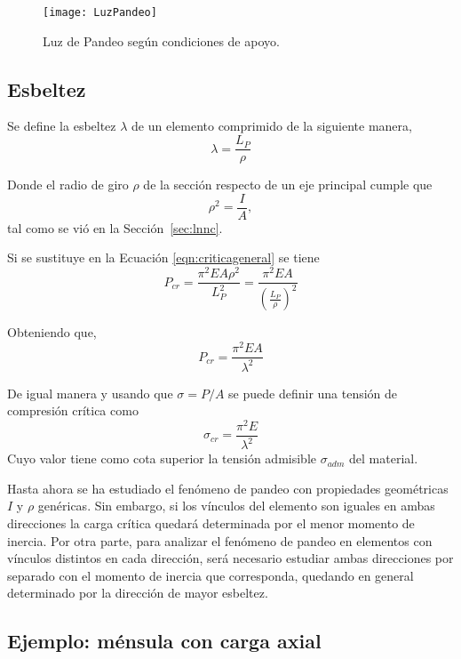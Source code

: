 \begin{figure}[htb]
	\centering
	\texttt{[image: LuzPandeo]}
	\caption{Luz de Pandeo según condiciones de apoyo.}
	\label{fig:luzpandeo}
\end{figure}

\subsection{Esbeltez}

Se define la esbeltez $\lambda$ de un elemento comprimido de la siguiente manera,
\begin{equation}
\lambda = \frac{L_P}{\rho}
\end{equation}

Donde el radio de giro $\rho$ de la sección respecto de un eje principal cumple que
\begin{equation}
\rho^2 = \frac{I}{A},
\end{equation}
tal como se vió en la Sección~\ref{sec:lnnc}.

Si se sustituye en la Ecuación \eqref{eqn:criticageneral} se tiene
$$
P_{cr} = \frac{\pi^2 E A \rho^2}{L_P^2} = \frac{\pi^2 E A}{\left(\frac{L_P}{\rho}\right)^2}
$$

Obteniendo que,
\begin{equation}
\boxed{P_{cr} = \frac{\pi^2 E A}{\lambda^2}}
\end{equation}

De igual manera y usando que $\sigma=P/A$ se puede definir una tensión de compresión crítica como  
\begin{equation}
\boxed{\sigma_{cr} = \frac{\pi^2 E}{\lambda^2}}
\end{equation}
Cuyo valor tiene como cota superior la tensión admisible $\sigma_{adm}$ del material.

Hasta ahora se ha estudiado el fenómeno de pandeo con propiedades geométricas $I$ y $\rho$ genéricas. Sin embargo, si los vínculos del elemento son iguales en ambas direcciones la carga crítica quedará determinada por el menor momento de inercia. Por otra parte, para analizar el fenómeno de pandeo en elementos con vínculos distintos en cada dirección, será necesario estudiar ambas direcciones por separado con el momento de inercia que corresponda, quedando en general determinado por la dirección de mayor esbeltez.

\subsection{Ejemplo: ménsula con carga axial}

